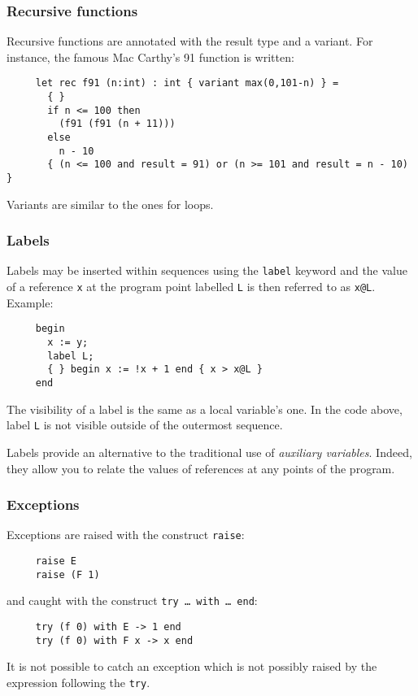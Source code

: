 \documentclass[a4paper,12pt]{report}
\newcommand{\te}[1]{\texttt{#1}}
\begin{document}
\subsubsection{Recursive functions}
Recursive functions are annotated with the result type and a variant.
For instance, the famous Mac Carthy's 91 function is written:
\begin{verbatim}
     let rec f91 (n:int) : int { variant max(0,101-n) } =
       { }
       if n <= 100 then
         (f91 (f91 (n + 11)))
       else
         n - 10
       { (n <= 100 and result = 91) or (n >= 101 and result = n - 10) }
\end{verbatim}
Variants are similar to the ones for loops.

\subsubsection{Labels}
Labels may be inserted within sequences using the 
\te{label} keyword and the value of a reference \texttt{x} at the
program point labelled \texttt{L} is then referred to as \texttt{x@L}.
Example:
\begin{verbatim}
     begin 
       x := y;
       label L; 
       { } begin x := !x + 1 end { x > x@L }
     end
\end{verbatim}
The visibility of a label is the same as a local variable's one. In
the code above, label \texttt{L} is not visible outside of the
outermost sequence.

Labels provide an alternative to the traditional use of
\emph{auxiliary variables}. Indeed, they
allow you to relate the values of references at any points of the
program. 


\subsubsection{Exceptions}
\label{exception}

Exceptions are raised with the construct \texttt{raise}:
\begin{verbatim}
     raise E
     raise (F 1)
\end{verbatim}
and caught with the construct \texttt{try \dots\ with \dots\ end}:
\begin{verbatim}
     try (f 0) with E -> 1 end 
     try (f 0) with F x -> x end
\end{verbatim}
It is not possible to catch an exception which is not possibly raised
by the expression following the \texttt{try}.
\end{document}
